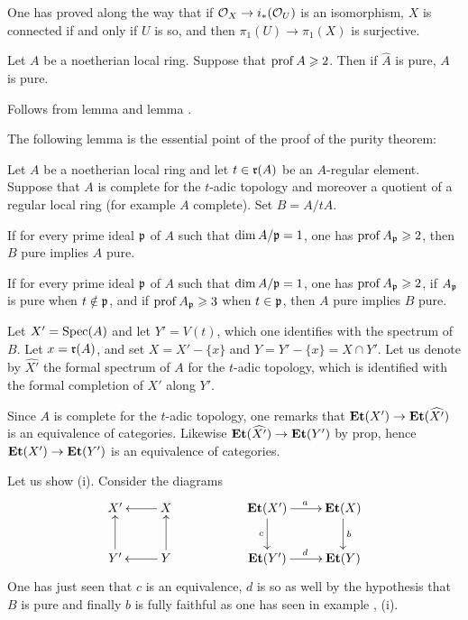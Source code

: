 \begin{remark} \label{X.3.7}
One has proved along the way that if $\OX\to i_\ast(\Oo_U)$ is an
isomorphism, $X$ is connected if and only if $U$ is so, and then
$\pi_1(U)\to\pi_1(X)$ is surjective.
\end{remark}

\begin{corollary} \label{X.3.8}
Let $A$ be a noetherian local ring. Suppose that $\operatorname{prof} A\geqslant 2$. Then
if $\hat{A}$ is pure, $A$ is pure.
\end{corollary}

Follows from lemma  and lemma .

The following lemma is the essential point of the proof of the purity
theorem:

\begin{lemma} \label{X.3.9}
Let $A$ be a noetherian local ring and let $t\in\mathfrak{r}(A)$ be an
$A$-regular element. Suppose that $A$ is complete for the $t$-adic
topology and moreover a quotient of a regular local ring (for example
$A$ complete). Set $B=A/tA$.
\begin{enumeratei}
\item
If for every prime ideal $\mathfrak{p}$ of $A$ such that $\dim A/\mathfrak{p}=1$, one has
$\operatorname{prof} A_{\mathfrak{p}}\geqslant 2$, then $B$ pure implies $A$ pure.

\item
If for every prime ideal $\mathfrak{p}$ of $A$ such that $\dim A/\mathfrak{p}=1$, one has
$\operatorname{prof} A_{\mathfrak{p}}\geqslant 2$, if $A_{\mathfrak{p}}$ is pure when $t\notin\mathfrak{p}$, and
if $\operatorname{prof} A_{\mathfrak{p}}\geqslant3$
when $t\in\mathfrak{p}$, then $A$ pure implies $B$ pure.
\end{enumeratei}
\end{lemma}

Let $X'=\operatorname{Spec}(A)$ and let $Y'=V(t)$, which one identifies with the
spectrum of $B$. Let $x=\mathfrak{r}(A)$, and set $X=X'-\{x\}$ and
$Y=Y'-\{x\}=X\cap Y'$. Let us denote by $\widehat{X'}$ the formal
spectrum of $A$ for the $t$-adic topology, which is identified with the
formal completion of $X'$ along $Y'$.

Since $A$ is complete for the $t$-adic topology, one remarks that
$\Et(X')\to\Et(\widehat{X'})$ is an equivalence of categories. Likewise
$\Et(\widehat{X'})\to\Et(Y')$ by prop\ptbl {}, hence
$\Et(X')\to\Et(Y')$ is an equivalence of categories.

Let us show (i). Consider the diagrams
\[
\UseTips \newdir{ >}{!/-5pt/\dir{>}} \xymatrix{ X' & X\ar[l] && \Et(X')\ar[r]^a \ar[d]_c & \Et(X)\ar[d]^b\\
Y'\ar[u] & Y\ar[l] \ar[u] && \Et(Y')\ar[r]^d & \Et(Y)}
\]
One has just seen that $c$ is an equivalence, $d$ is so as well by the
hypothesis that $B$ is pure and finally $b$ is fully faithful as one
has seen in example , \cf {} (i).

